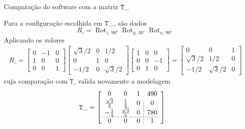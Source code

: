 \documentclass[aspectratio=169]{beamer}
\DeclareMathOperator{\Rot}{Rot}
\begin{document}
\begin{frame}{Comparação do software com a matriz $\tt T\_$}
    
    Para a configuração escolhida em $\tt T\_$, são dados
    \begin{equation*}
        R\_ = \Rot_{z,\,\ang{90}} \Rot_{y,\,\ang{30}} \Rot_{x,\,\ang{90}}
    \end{equation*}
    Aplicando os valores
    \begin{align*}
    R\_ = 
        \left[ 
    \begin{array}{rrr}
        0 & -1 & 0 \\
        1 &  0 & 0 \\
        0 &  0 & 1
    \end{array}
    \right]
    \left[ 
    \begin{array}{rrr}
        \sqrt{3}/2 & 0 & 1/2 \\
        0 &  1 & 0 \\
        -1/2 &  0 & \sqrt{3}/2
    \end{array}
    \right]
    \left[ 
    \begin{array}{rrr}
        1 & 0 &  0 \\
        0 & 0 & -1 \\
        0 & 1 & 0
    \end{array}
    \right] = \left[ 
    \begin{array}{rrr}
        0 & 0 & 1 \\
        \sqrt{3}/2 & 1/2 & 0 \\
        -1/2 & \sqrt{3}/2 & 0
    \end{array}
    \right] \label{eq:R_robodk}
    \end{align*}
    cuja comparação com $\mathtt{T\_}$ valida novamente a modelagem
    \begin{align*}
    \mathtt{T\_} 
    &=
    \left[
    \begin{array}{ccc;{2pt/2pt}c}
        0 & 0 & 1 & 490 \\
        \frac{\sqrt{3}}{2} & \frac{1}{2} & 0 & 0 \\  -\frac{1}{2} & \frac{\sqrt{3}}{2} & 0 & 780 \\
        \hdashline[2pt/2pt]
        0 & 0 & 0 & 1
    \end{array}
    \right]
\end{align*}
\end{frame}
\end{document}
